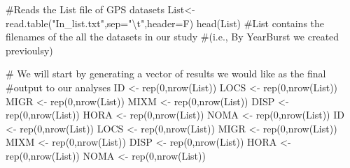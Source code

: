 \documentclass[
  letterpaper,
]{book}
\newenvironment{Shaded}{\begin{snugshade}}{\end{snugshade}}
\newcommand{\AttributeTok}[1]{\textcolor[rgb]{0.40,0.45,0.13}{#1}}
\newcommand{\CommentTok}[1]{\textcolor[rgb]{0.37,0.37,0.37}{#1}}
\newcommand{\DecValTok}[1]{\textcolor[rgb]{0.68,0.00,0.00}{#1}}
\newcommand{\FunctionTok}[1]{\textcolor[rgb]{0.28,0.35,0.67}{#1}}
\newcommand{\NormalTok}[1]{\textcolor[rgb]{0.00,0.23,0.31}{#1}}
\newcommand{\OtherTok}[1]{\textcolor[rgb]{0.00,0.23,0.31}{#1}}
\newcommand{\SpecialCharTok}[1]{\textcolor[rgb]{0.37,0.37,0.37}{#1}}
\newcommand{\StringTok}[1]{\textcolor[rgb]{0.13,0.47,0.30}{#1}}
\begin{document}
\begin{Shaded}
\begin{Highlighting}[]
\CommentTok{\#Reads the List file of GPS datasets}
\NormalTok{List}\OtherTok{\textless{}{-}}\FunctionTok{read.table}\NormalTok{(}\StringTok{"In\_list.txt"}\NormalTok{,}\AttributeTok{sep=}\StringTok{"}\SpecialCharTok{\textbackslash{}t}\StringTok{"}\NormalTok{,}\AttributeTok{header=}\NormalTok{F)}
\FunctionTok{head}\NormalTok{(List) }\CommentTok{\#List contains the filenames of the all the datasets in our study }
\CommentTok{\#(i.e., By YearBurst we created previoulsy)}

\CommentTok{\# We will start by generating a vector of results we would like as the final}
\CommentTok{\#output to our analyses}
\NormalTok{ID }\OtherTok{\textless{}{-}} \FunctionTok{rep}\NormalTok{(}\DecValTok{0}\NormalTok{,}\FunctionTok{nrow}\NormalTok{(List))}
\NormalTok{LOCS }\OtherTok{\textless{}{-}} \FunctionTok{rep}\NormalTok{(}\DecValTok{0}\NormalTok{,}\FunctionTok{nrow}\NormalTok{(List))}
\NormalTok{MIGR }\OtherTok{\textless{}{-}} \FunctionTok{rep}\NormalTok{(}\DecValTok{0}\NormalTok{,}\FunctionTok{nrow}\NormalTok{(List))}
\NormalTok{MIXM }\OtherTok{\textless{}{-}} \FunctionTok{rep}\NormalTok{(}\DecValTok{0}\NormalTok{,}\FunctionTok{nrow}\NormalTok{(List))}
\NormalTok{DISP }\OtherTok{\textless{}{-}} \FunctionTok{rep}\NormalTok{(}\DecValTok{0}\NormalTok{,}\FunctionTok{nrow}\NormalTok{(List))}
\NormalTok{HORA }\OtherTok{\textless{}{-}} \FunctionTok{rep}\NormalTok{(}\DecValTok{0}\NormalTok{,}\FunctionTok{nrow}\NormalTok{(List))}
\NormalTok{NOMA }\OtherTok{\textless{}{-}} \FunctionTok{rep}\NormalTok{(}\DecValTok{0}\NormalTok{,}\FunctionTok{nrow}\NormalTok{(List))}
\NormalTok{ID }\OtherTok{\textless{}{-}} \FunctionTok{rep}\NormalTok{(}\DecValTok{0}\NormalTok{,}\FunctionTok{nrow}\NormalTok{(List))}
\NormalTok{LOCS }\OtherTok{\textless{}{-}} \FunctionTok{rep}\NormalTok{(}\DecValTok{0}\NormalTok{,}\FunctionTok{nrow}\NormalTok{(List))}
\NormalTok{MIGR }\OtherTok{\textless{}{-}} \FunctionTok{rep}\NormalTok{(}\DecValTok{0}\NormalTok{,}\FunctionTok{nrow}\NormalTok{(List))}
\NormalTok{MIXM }\OtherTok{\textless{}{-}} \FunctionTok{rep}\NormalTok{(}\DecValTok{0}\NormalTok{,}\FunctionTok{nrow}\NormalTok{(List))}
\NormalTok{DISP }\OtherTok{\textless{}{-}} \FunctionTok{rep}\NormalTok{(}\DecValTok{0}\NormalTok{,}\FunctionTok{nrow}\NormalTok{(List))}
\NormalTok{HORA }\OtherTok{\textless{}{-}} \FunctionTok{rep}\NormalTok{(}\DecValTok{0}\NormalTok{,}\FunctionTok{nrow}\NormalTok{(List))}
\NormalTok{NOMA }\OtherTok{\textless{}{-}} \FunctionTok{rep}\NormalTok{(}\DecValTok{0}\NormalTok{,}\FunctionTok{nrow}\NormalTok{(List))}

\end{Highlighting}
\end{Shaded}
\end{document}
